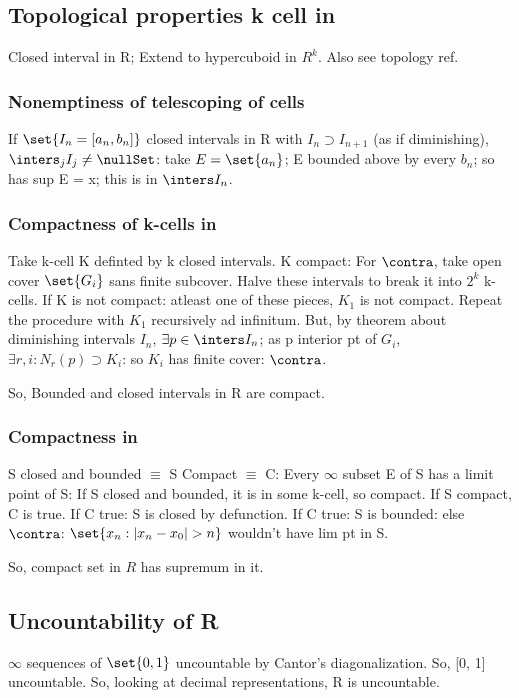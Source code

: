 \documentclass[oneside, article]{memoir}
\begin{document}
\subsection{Topological properties k cell in }
Closed interval in R; Extend to hypercuboid in $R^{k}$. Also see topology ref.

\subsubsection{Nonemptiness of telescoping  of cells}
If $\set{I_{n} = [a_{n}, b_{n}]}$ closed intervals in R with $I_{n} \supset I_{n+1}$ (as if diminishing), $\inters_{j} I_{j} \neq \nullSet$: take $E = \set{a_{n}}$; E bounded above by every $b_{n}$; so has sup E = x; this is in $\inters I_{n}$.

\subsubsection{Compactness of k-cells in }
Take k-cell K definted by k closed intervals. K compact: For $\contra$, take open cover $\set{G_{i}}$ sans finite subcover. Halve these intervals to break it into $2^{k}$ k-cells. If K is not compact: atleast one of these pieces, $K_{1}$ is not compact. Repeat the procedure with $K_{1}$ recursively ad infinitum. But, by theorem about diminishing intervals $I_{n}$, $\exists p \in \inters I_{n}$; as p interior pt of $G_{i}$,  $\exists r, i: N_{r}(p) \supset K_{i}$: so $K_{i}$ has finite cover: $\contra $.

So, Bounded and closed intervals in R are compact.

\subsubsection{Compactness in }
S closed and bounded $\equiv$ S Compact $\equiv$ C: Every $\infty$ subset E of S has a limit point of S: If S closed and bounded, it is in some k-cell, so compact. If S compact, C is true. If C true: S is closed by defunction. If C true: S is bounded: else $\contra$: $\set{x_{n}: |x_{n} - x_{0}| > n}$ wouldn't have lim pt in S.

So, compact set in $R$ has supremum in it.

\subsection{Uncountability of R}
$\infty$ sequences of $\set{0, 1}$ uncountable by Cantor's diagonalization. So, [0, 1] uncountable. So, looking at decimal representations, R is uncountable.
\end{document}
